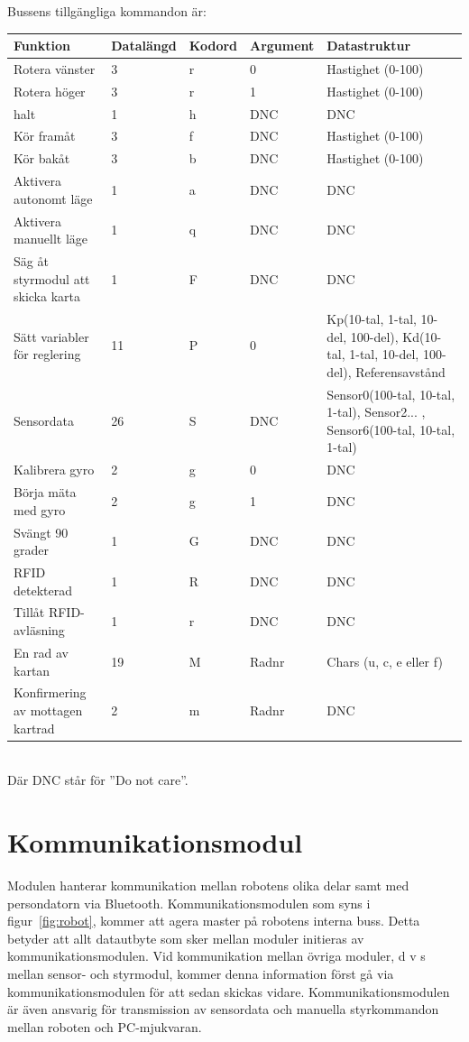 \documentclass[a4paper,12pt,fleqn]{article}
\begin{document}
\newpage
Bussens tillgängliga kommandon är:

\begin{tabular}{| p{} | p{} | p{} | p{} | p{} |}
	\hline
	\rowcolor{listinggray}
	\textbf{Funktion} & \textbf{Datalängd} & \textbf{Kodord} & \textbf{Argument} & \textbf{Datastruktur} \\ \hline
	Rotera vänster & 3 & r & 0 & Hastighet (0-100) \\ \hline
	Rotera höger & 3 & r & 1 & Hastighet (0-100) \\ \hline
	halt & 1 & h & DNC & DNC \\ \hline
	Kör framåt & 3 & f & DNC & Hastighet (0-100) \\ \hline
	Kör bakåt & 3 & b & DNC & Hastighet (0-100) \\ \hline
	Aktivera autonomt läge & 1 & a & DNC & DNC \\ \hline
	Aktivera manuellt läge & 1 & q & DNC & DNC \\ \hline
	Säg åt styrmodul att skicka karta & 1 & F & DNC & DNC \\ \hline
	Sätt variabler för reglering & 11 & P & 0 & Kp(10-tal, 1-tal, 10-del, 100-del), Kd(10-tal, 1-tal, 10-del, 100-del), Referensavstånd \\ \hline
	Sensordata & 26 & S & DNC & Sensor0(100-tal, 10-tal, 1-tal), Sensor2... , Sensor6(100-tal, 10-tal, 1-tal) \\ \hline
	Kalibrera gyro & 2 & g & 0 & DNC \\ \hline
	Börja mäta med gyro & 2 & g & 1 & DNC \\ \hline
	Svängt 90 grader & 1 & G & DNC & DNC \\ \hline
	RFID detekterad & 1 & R & DNC & DNC \\ \hline
	Tillåt RFID-avläsning & 1 & r & DNC & DNC \\ \hline
	En rad av kartan & 19 & M & Radnr & Chars (u, c, e eller f) \\ \hline
	Konfirmering av mottagen kartrad & 2 & m & Radnr & DNC \\ \hline
\end{tabular}
~\\
Där DNC står för ''Do not care''.
\newpage


\section{Kommunikationsmodul}
Modulen hanterar kommunikation mellan robotens olika delar samt med persondatorn via Bluetooth. Kommunikationsmodulen som syns i figur~\ref{fig:robot}, kommer att agera master på robotens interna buss. Detta betyder att allt datautbyte som sker mellan moduler initieras av kommunikationsmodulen. 
Vid kommunikation mellan övriga moduler, d v s mellan sensor- och styrmodul, kommer denna information först gå via kommunikationsmodulen för att sedan skickas vidare.
Kommunikationsmodulen är även ansvarig för transmission av sensordata och manuella styrkommandon mellan roboten och PC-mjukvaran.
\end{document}

